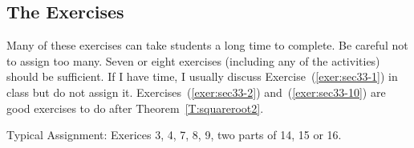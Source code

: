\subsection*{The Exercises}
Many of these exercises can take students a long time to complete.  Be careful not to assign too many.  Seven or eight exercises (including any of the activities) should be sufficient.  If I have time, I usually discuss Exercise~(\ref{exer:sec33-1}) in class but do not assign it.  
Exercises~(\ref{exer:sec33-2}) and~(\ref{exer:sec33-10}) are good exercises to do after 
Theorem~\ref{T:squareroot2}.  

\vskip6pt
\noindent
Typical Assignment:  Exerices 3, 4, 7, 8, 9, two parts of 14, 15 or 16.


\endinput

For Exercise~(\ref{exer:sec33-6}), some students will try to use the quadratic formula.  This can work but it gets quite messy.  A proof by contradiction provides a nice alternative method for this exercise.

